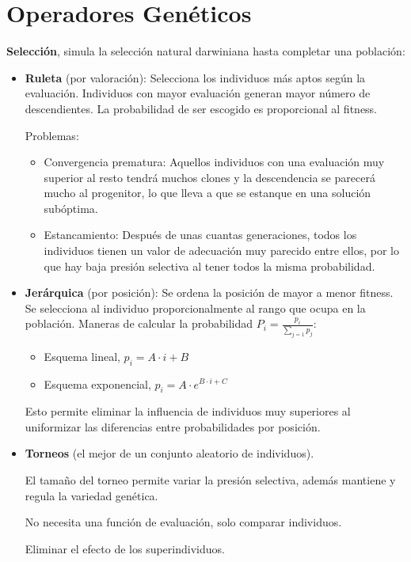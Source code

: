 \documentclass[12pt, twoside, openright]{report} %
\begin{document}
\section{Operadores Genéticos}
\textbf{Selección}, simula la selección natural darwiniana hasta completar una población:
\begin{itemize}
	\item \textbf{Ruleta} (por valoración): Selecciona los individuos más aptos según la evaluación. Individuos con mayor evaluación generan mayor número de descendientes. La probabilidad de ser escogido es proporcional al fitness.

	      Problemas:
	      \begin{itemize}
		      \item Convergencia prematura: Aquellos individuos con una evaluación muy superior al resto tendrá muchos clones y la descendencia se parecerá mucho al progenitor, lo que lleva a que se estanque en una solución subóptima.
		      \item Estancamiento: Después de unas cuantas generaciones, todos los individuos tienen un valor de adecuación muy parecido entre ellos, por lo que hay baja presión selectiva al tener todos la misma probabilidad.
	      \end{itemize}
	\item \textbf{Jerárquica} (por posición): Se ordena la posición de mayor a menor fitness. Se selecciona al individuo proporcionalmente al rango que ocupa en la población. Maneras de calcular la probabilidad $P_i=\frac{p_i}{\sum_{j=1} p_j}$:
	      \begin{itemize}
		      \item Esquema lineal, $p_i=A\cdot i + B$
		      \item Esquema exponencial, $p_i=A\cdot e^{B\cdot i+C}$
	      \end{itemize}

	      Esto permite eliminar la influencia de individuos muy superiores al uniformizar las diferencias entre probabilidades por posición.
	\item \textbf{Torneos} (el mejor de un conjunto aleatorio de individuos).

	      El tamaño del torneo permite variar la presión selectiva, además mantiene y regula la variedad genética.

	      No necesita una función de evaluación, solo comparar individuos.

	      Eliminar el efecto de los superindividuos.
\end{itemize}
\end{document}
